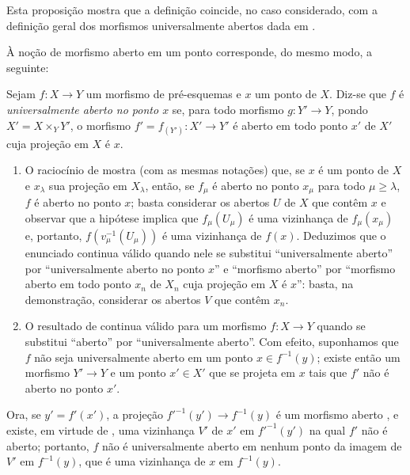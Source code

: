 Esta proposição mostra que a definição  coincide, no caso considerado, com a definição geral dos morfismos universalmente abertos dada em .

À noção de morfismo aberto em um ponto  corresponde, do mesmo modo, a seguinte:

\begin{definition}[14.3.3]
\label{IV.14.3.3}
Sejam $f:X\to Y$ um morfismo de pré-esquemas e $x$ um ponto de $X$.
Diz-se que $f$ é \emph{universalmente aberto no ponto $x$} se, para todo morfismo $g:Y'\to Y$, pondo $X'=X\times_Y Y'$, o morfismo $f'=f_{(Y')}:X'\to Y'$ é aberto em todo ponto $x'$ de $X'$ cuja projeção em $X$ é $x$.
\end{definition}

\begin{remarks}[14.3.3.1]
\label{IV.14.3.3.1}
\begin{enumerate}[label=(\roman*)]
  \item O raciocínio de  mostra (com as mesmas notações) que, se $x$ é um ponto de $X$ e $x_\lambda$ sua projeção em $X_\lambda$, então, se $f_\mu$ é aberto no ponto $x_\mu$ para todo $\mu\geq\lambda$, $f$ é aberto no ponto $x$; basta considerar os abertos $U$ de $X$ que contêm $x$ e observar que a hipótese implica que $f_\mu(U_\mu)$ é uma vizinhança de $f_\mu(x_\mu)$ e, portanto, $f(v_\mu^{-1}(U_\mu))$ é uma vizinhança de $f(x)$.
  Deduzimos que o enunciado  continua válido quando nele se substitui “universalmente aberto” por “universalmente aberto no ponto $x$” e “morfismo aberto” por “morfismo aberto em todo ponto $x_n$ de $X_n$ cuja projeção em $X$ é $x$”: basta, na demonstração, considerar os abertos $V$ que contêm $x_n$.

  \item O resultado de  continua válido para um morfismo $f:X\to Y$ quando se substitui “aberto” por “universalmente aberto”.
  Com efeito, suponhamos que $f$ não seja universalmente aberto em um ponto $x\in f^{-1}(y)$; existe então um morfismo $Y'\to Y$ e um ponto $x'\in X'$ que se projeta em $x$ tais que $f'$ não é aberto no ponto $x'$.
\end{enumerate}
\end{remarks}


Ora, se $y'=f'(x')$, a projeção $f'^{-1}(y')\to f^{-1}(y)$ é um morfismo aberto , e existe, em virtude de , uma vizinhança $V'$ de $x'$ em $f'^{-1}(y')$ na qual $f'$ não é aberto; portanto, $f$ não é universalmente aberto em nenhum ponto da imagem de $V'$ em $f^{-1}(y)$, que é uma vizinhança de $x$ em $f^{-1}(y)$.

